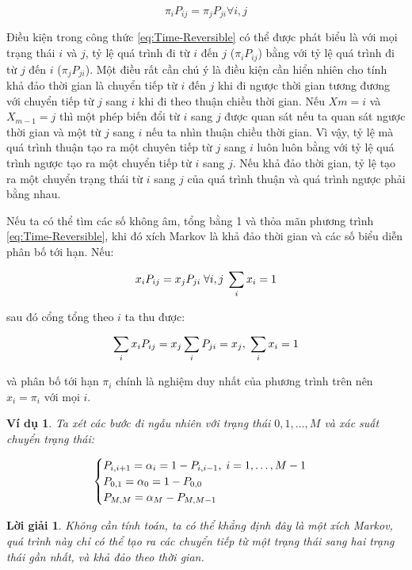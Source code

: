 \documentclass[14pt, a4paper]{article}
\numberwithin{equation}{section}
\numberwithin{figure}{section}
\theoremstyle{sltheorem}
\newtheorem{vd}{Ví dụ}
\theoremstyle{soltheorem}
\newtheorem*{loigiai}{Lời giải}
\numberwithin{dl}{section}
\numberwithin{vd}{section}
\begin{document}
    \begin{equation} \label{eq:Time-Reversible}
        \pi_i P_{ij} = \pi_j P_{ji} \forall i, j
    \end{equation}

    Điều kiện trong công thức \ref{eq:Time-Reversible} có thể được phát biểu là với mọi trạng thái $i$ và $j$, tỷ lệ quá trình đi từ $i$ đến $j$ ($\pi_i P_{ij}$) bằng với tỷ lệ quá trình đi từ $j$ đến $i$ ($\pi_j P_{ji}$).
    Một điều rất cần chú ý là điều kiện cần hiển nhiên cho tính khả đảo thời gian là chuyển tiếp từ $i$ đến $j$ khi đi ngược thời gian tương đương với chuyển tiếp từ $j$ sang $i$ khi đi theo thuận chiều thời gian.
    Nếu $Xm=i$ và $X_{m-1}=j$ thì một phép biến đổi từ $i$ sang $j$ được quan sát nếu ta quan sát ngược thời gian và một từ $j$ sang $i$ nếu ta nhìn thuận chiều thời gian.
    Vì vậy, tỷ lệ mà quá trình thuận tạo ra một chuyên tiếp từ $j$ sang $i$ luôn luôn bằng với tỷ lệ quá trình ngược tạo ra một chuyển tiếp từ $i$ sang $j$.
    Nếu khả đảo thời gian, tỷ lệ tạo ra một chuyển trạng thái từ $i$ sang $j$ của quá trình thuận và quá trình ngược phải bằng nhau.

    Nếu ta có thể tìm các số không âm, tổng bằng 1 và thỏa mãn phương trình \ref{eq:Time-Reversible}, khi đó xích Markov là khả đảo thời gian và các số biểu diễn phân bố tới hạn. Nếu:

    \begin{equation}
        x_i P_{ij} = x_j P_{ji} \thickspace \forall i, j \thickspace \sum_{i} x_i = 1
    \end{equation}

    sau đó cổng tổng theo $i$ ta thu được:

    \begin{equation*}
        \sum_i x_i P_{ij} = x_j \sum_i P_{ji} = x_j, \thickspace \sum_{i} x_i = 1
    \end{equation*}

    và phân bố tới hạn $\pi_i$ chính là nghiệm duy nhất của phương trình trên nên $x_i = \pi_i$ với mọi $i$.

    \begin{vd}
        Ta xét các bước đi ngẫu nhiên với trạng thái $0, 1, \dots, M$ và xác suất chuyển trạng thái:

        \begin{equation*}
            \begin{cases}
                P_{i, i+1} = \alpha_i = 1 - P_{i, i - 1}, \thickspace i=1, \dots, M-1 \\
                P_{0, 1} = \alpha_0 = 1 - P_{0, 0} \\
                P_{M,M} = \alpha_M - P_{M, M-1}
            \end{cases}
        \end{equation*}
    \end{vd}

    \begin{loigiai}
        Không cần tính toán, ta có thể khẳng định đây là một xích Markov, quá trình này chỉ có thể tạo ra các chuyển tiếp từ một trạng thái sang hai trạng thái gần nhất, và khả đảo theo thời gian.
        
    \end{loigiai}
\end{document}
